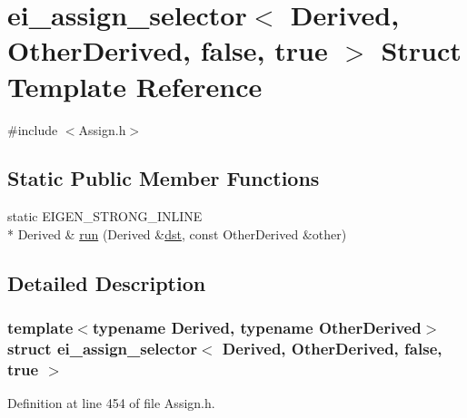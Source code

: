 \hypertarget{structei__assign__selector_3_01_derived_00_01_other_derived_00_01false_00_01true_01_4}{\section{ei\-\_\-assign\-\_\-selector$<$ Derived, Other\-Derived, false, true $>$ Struct Template Reference}
\label{structei__assign__selector_3_01_derived_00_01_other_derived_00_01false_00_01true_01_4}
}


{\ttfamily \#include $<$Assign.\-h$>$}

\subsection*{Static Public Member Functions}
\begin{DoxyCompactItemize}
\item 
static E\-I\-G\-E\-N\-\_\-\-S\-T\-R\-O\-N\-G\-\_\-\-I\-N\-L\-I\-N\-E \\*
Derived \& \hyperlink{structei__assign__selector_3_01_derived_00_01_other_derived_00_01false_00_01true_01_4_a6a63702fe56170f55a37314ff9164702}{run} (Derived \&\hyperlink{glext_8h_a92034251bfd455d524a9b5610cddba00}{dst}, const Other\-Derived \&other)
\end{DoxyCompactItemize}


\subsection{Detailed Description}
\subsubsection*{template$<$typename Derived, typename Other\-Derived$>$struct ei\-\_\-assign\-\_\-selector$<$ Derived, Other\-Derived, false, true $>$}



Definition at line 454 of file Assign.\-h.




